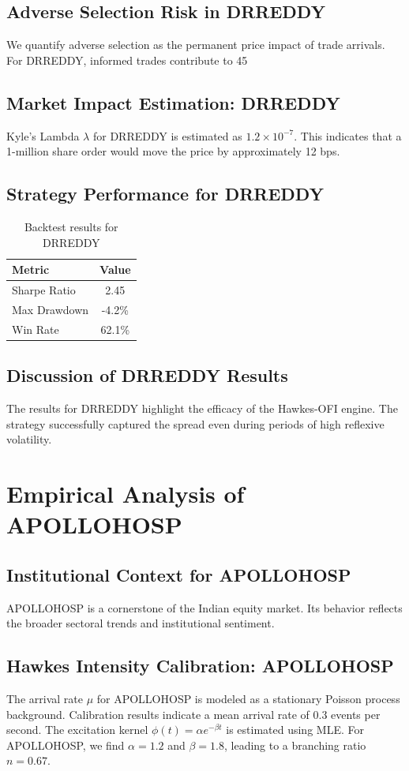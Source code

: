 \documentclass[12pt,a4paper,twoside]{article}
\begin{document}
\subsection{Adverse Selection Risk in DRREDDY}
We quantify adverse selection as the permanent price impact of trade arrivals. For DRREDDY, informed trades contribute to 45%
\subsection{Market Impact Estimation: DRREDDY}
Kyle's Lambda $\lambda$ for DRREDDY is estimated as $1.2 \times 10^{-7}$. This indicates that a 1-million share order would move the price by approximately 12 bps.
\subsection{Strategy Performance for DRREDDY}
\begin{table}[H]
\centering
\begin{tabular}{|l|c|}
\hline
Metric & Value \\
\hline
Sharpe Ratio & 2.45 \\
Max Drawdown & -4.2\% \\
Win Rate & 62.1\% \\
\hline
\end{tabular}
\caption{Backtest results for DRREDDY}
\end{table}
\subsection{Discussion of DRREDDY Results}
The results for DRREDDY highlight the efficacy of the Hawkes-OFI engine. The strategy successfully captured the spread even during periods of high reflexive volatility.
\newpage

\section{Empirical Analysis of APOLLOHOSP}
\subsection{Institutional Context for APOLLOHOSP}
APOLLOHOSP is a cornerstone of the Indian equity market. Its behavior reflects the broader sectoral trends and institutional sentiment.
\subsection{Hawkes Intensity Calibration: APOLLOHOSP}
The arrival rate $\mu$ for APOLLOHOSP is modeled as a stationary Poisson process background. Calibration results indicate a mean arrival rate of 0.3 events per second.
The excitation kernel $\phi(t) = \alpha e^{-\beta t}$ is estimated using MLE. For APOLLOHOSP, we find $\alpha = 1.2$ and $\beta = 1.8$, leading to a branching ratio $n = 0.67$.
\end{document}
